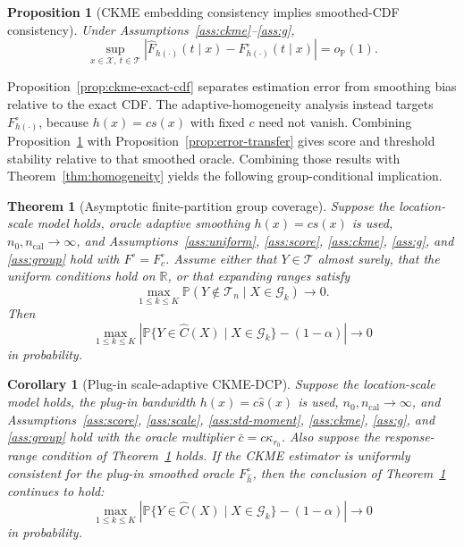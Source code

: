 \documentclass[11pt]{article}
\newtheorem{proposition}{Proposition}
\newtheorem{theorem}{Theorem}
\newtheorem{corollary}{Corollary}
\newcommand{\Xcal}{\mathcal X}
\newcommand{\Gcal}{\mathcal G}
\newcommand{\Tcal}{\mathcal T}
\newcommand{\Pp}{\mathbb P}
\newcommand{\R}{\mathbb R}
\newcommand{\abs}[1]{\left\lvert #1 \right\rvert}
\newcommand{\op}{o_{\mathbb P}}
\begin{document}
\begin{proposition}[CKME embedding consistency implies smoothed-CDF consistency]
\label{prop:ckme-cdf}
Under Assumptions~\ref{ass:ckme}--\ref{ass:g},
\[
  \sup_{x\in\Xcal,\ t\in\Tcal}
  \abs{\widehat F_{h(\cdot)}(t\mid x)-F_{h(\cdot)}^\circ(t\mid x)}
  =\op(1).
\]
\end{proposition}

Proposition~\ref{prop:ckme-exact-cdf} separates estimation error from smoothing bias relative to the exact CDF. The adaptive-homogeneity analysis instead targets \(F_{h(\cdot)}^\circ\), because \(h(x)=c s(x)\) with fixed \(c\) need not vanish. Combining Proposition~\ref{prop:ckme-cdf} with Proposition~\ref{prop:error-transfer} gives score and threshold stability relative to that smoothed oracle. Combining those results with Theorem~\ref{thm:homogeneity} yields the following group-conditional implication.

\begin{theorem}[Asymptotic finite-partition group coverage]
\label{thm:group}
Suppose the location-scale model holds, oracle adaptive smoothing \(h(x)=c s(x)\) is used, \(n_0,n_{\mathrm{cal}}\to\infty\), and Assumptions~\ref{ass:uniform}, \ref{ass:score}, \ref{ass:ckme}, \ref{ass:g}, and \ref{ass:group} hold with \(F^\circ=F_c^\circ\). Assume either that \(Y\in\Tcal\) almost surely, that the uniform conditions hold on \(\R\), or that expanding ranges satisfy
\[
  \max_{1\le k\le K}
  \Pp(Y\notin\Tcal_n\mid X\in\Gcal_k)\to0.
\]
Then
\[
  \max_{1\le k\le K}
  \abs{
  \Pp\{Y\in\widehat C(X)\mid X\in\Gcal_k\}
  -(1-\alpha)
  }
  \to 0
\]
in probability.
\end{theorem}

\begin{corollary}[Plug-in scale-adaptive CKME-DCP]
\label{cor:plugin-group}
Suppose the location-scale model holds, the plug-in bandwidth \(h(x)=c\widehat s(x)\) is used, \(n_0,n_{\mathrm{cal}}\to\infty\), and Assumptions~\ref{ass:score}, \ref{ass:scale}, \ref{ass:std-moment}, \ref{ass:ckme}, \ref{ass:g}, and \ref{ass:group} hold with the oracle multiplier \(\bar c=c\kappa_{r_0}\). Also suppose the response-range condition of Theorem~\ref{thm:group} holds. If the CKME estimator is uniformly consistent for the plug-in smoothed oracle \(F_{\widehat h}^{\circ}\), then the conclusion of Theorem~\ref{thm:group} continues to hold:
\[
  \max_{1\le k\le K}
  \abs{
  \Pp\{Y\in\widehat C(X)\mid X\in\Gcal_k\}
  -(1-\alpha)
  }
  \to 0
\]
in probability.
\end{corollary}
\end{document}
